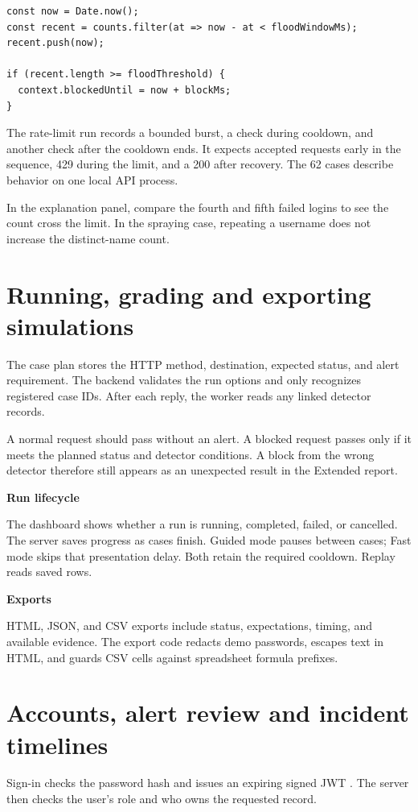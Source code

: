 \documentclass[11pt,a4paper,oneside]{report}
\newcommand{\topic}[1]{\par\addvspace{4pt}\noindent\textbf{#1}\par\nobreak\vspace{-.20em}}
\newcommand{\sheet}[1]{\clearpage\section{#1}}
\begin{document}
\begin{lstlisting}[caption={Adapted sliding-window logic from the request-rate detector}]
const now = Date.now();
const recent = counts.filter(at => now - at < floodWindowMs);
recent.push(now);

if (recent.length >= floodThreshold) {
  context.blockedUntil = now + blockMs;
}
\end{lstlisting}

The rate-limit run records a bounded burst, a check during cooldown, and another check after the cooldown ends. It expects accepted requests early in the sequence, 429 during the limit, and a 200 after recovery. The 62 cases describe behavior on one local API process.

In the explanation panel, compare the fourth and fifth failed logins to see the count cross the limit. In the spraying case, repeating a username does not increase the distinct-name count.

\sheet{Running, grading and exporting simulations}
The case plan stores the HTTP method, destination, expected status, and alert requirement. The backend validates the run options and only recognizes registered case IDs. After each reply, the worker reads any linked detector records.



A normal request should pass without an alert. A blocked request passes only if it meets the planned status and detector conditions. A block from the wrong detector therefore still appears as an unexpected result in the Extended report.

\topic{Run lifecycle}
The dashboard shows whether a run is running, completed, failed, or cancelled. The server saves progress as cases finish. Guided mode pauses between cases; Fast mode skips that presentation delay. Both retain the required cooldown. Replay reads saved rows.

\topic{Exports}
HTML, JSON, and CSV exports include status, expectations, timing, and available evidence. The export code redacts demo passwords, escapes text in HTML, and guards CSV cells against spreadsheet formula prefixes.

\sheet{Accounts, alert review and incident timelines}
Sign-in checks the password hash and issues an expiring signed JWT \cite{jwt}. The server then checks the user's role and who owns the requested record.
\end{document}
